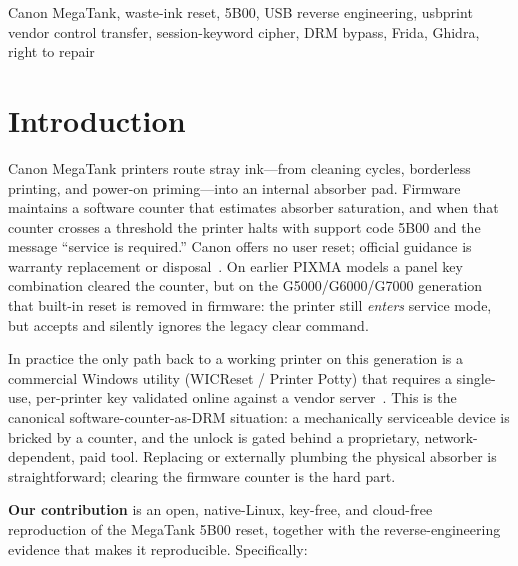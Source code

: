 \documentclass[conference]{IEEEtran}
\begin{document}
\begin{IEEEkeywords}
Canon MegaTank, waste-ink reset, 5B00, USB reverse engineering, usbprint
vendor control transfer, session-keyword cipher, DRM bypass, Frida,
Ghidra, right to repair
\end{IEEEkeywords}

\section{Introduction}
\label{sec:intro}

Canon MegaTank printers route stray ink---from cleaning cycles, borderless
printing, and power-on priming---into an internal absorber pad. Firmware
maintains a software counter that estimates absorber saturation, and when
that counter crosses a threshold the printer halts with support code 5B00
and the message ``service is required.'' Canon offers no user reset;
official guidance is warranty replacement or disposal~\cite{canon-5b00-support}.
On earlier PIXMA models a panel key combination cleared the counter, but
on the G5000/G6000/G7000 generation that built-in reset is removed in
firmware: the printer still \emph{enters} service mode, but accepts and
silently ignores the legacy clear command.

In practice the only path back to a working printer on this generation is
a commercial Windows utility (WICReset / Printer Potty) that requires a
single-use, per-printer key validated online against a vendor
server~\cite{octoinkjet-wicreset}. This is the canonical
software-counter-as-DRM situation: a mechanically serviceable device is
bricked by a counter, and the unlock is gated behind a proprietary,
network-dependent, paid tool. Replacing or externally plumbing the
physical absorber is straightforward; clearing the firmware counter is
the hard part.

\textbf{Our contribution} is an open, native-Linux, key-free, and
cloud-free reproduction of the MegaTank 5B00 reset, together with the
reverse-engineering evidence that makes it reproducible. Specifically:
\end{document}
